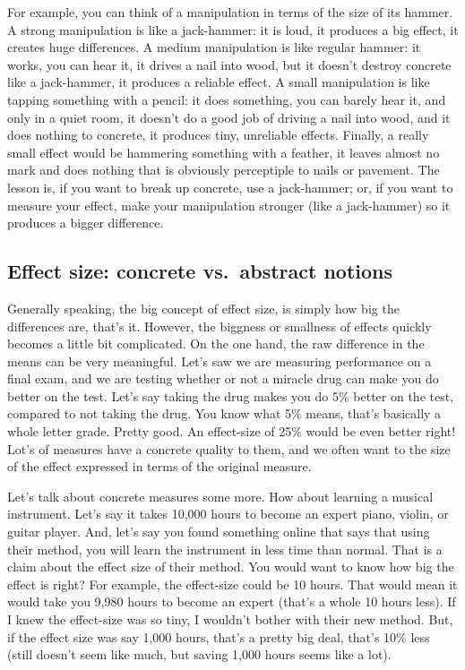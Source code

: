 \documentclass[]{book}
\begin{document}
For example, you can think of a manipulation in terms of the size of its hammer. A strong manipulation is like a jack-hammer: it is loud, it produces a big effect, it creates huge differences. A medium manipulation is like regular hammer: it works, you can hear it, it drives a nail into wood, but it doesn't destroy concrete like a jack-hammer, it produces a reliable effect. A small manipulation is like tapping something with a pencil: it does something, you can barely hear it, and only in a quiet room, it doesn't do a good job of driving a nail into wood, and it does nothing to concrete, it produces tiny, unreliable effects. Finally, a really small effect would be hammering something with a feather, it leaves almost no mark and does nothing that is obviously perceptiple to nails or pavement. The lesson is, if you want to break up concrete, use a jack-hammer; or, if you want to measure your effect, make your manipulation stronger (like a jack-hammer) so it produces a bigger difference.

\hypertarget{effect-size-concrete-vs.abstract-notions}{%
\subsection{Effect size: concrete vs.~abstract notions}\label{effect-size-concrete-vs.abstract-notions}}

Generally speaking, the big concept of effect size, is simply how big the differences are, that's it. However, the biggness or smallness of effects quickly becomes a little bit complicated. On the one hand, the raw difference in the means can be very meaningful. Let's saw we are measuring performance on a final exam, and we are testing whether or not a miracle drug can make you do better on the test. Let's say taking the drug makes you do 5\% better on the test, compared to not taking the drug. You know what 5\% means, that's basically a whole letter grade. Pretty good. An effect-size of 25\% would be even better right! Lot's of measures have a concrete quality to them, and we often want to the size of the effect expressed in terms of the original measure.

Let's talk about concrete measures some more. How about learning a musical instrument. Let's say it takes 10,000 hours to become an expert piano, violin, or guitar player. And, let's say you found something online that says that using their method, you will learn the instrument in less time than normal. That is a claim about the effect size of their method. You would want to know how big the effect is right? For example, the effect-size could be 10 hours. That would mean it would take you 9,980 hours to become an expert (that's a whole 10 hours less). If I knew the effect-size was so tiny, I wouldn't bother with their new method. But, if the effect size was say 1,000 hours, that's a pretty big deal, that's 10\% less (still doesn't seem like much, but saving 1,000 hours seems like a lot).
\end{document}
